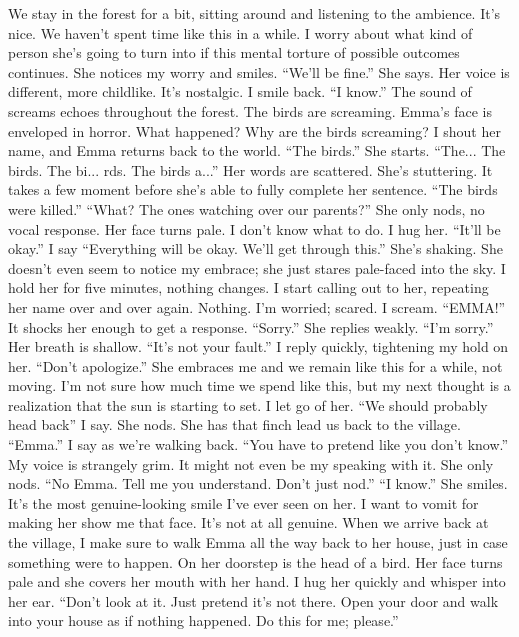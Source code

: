 \documentclass[openany, 12pt]{book}
\newcommand\tab[1][1cm]{\hspace*{#1}}
\begin{document}
\tab
We stay in the forest for a bit, sitting around and listening to the ambience. It’s nice. We haven’t spent time like this in a while. I worry about what kind of person she’s going to turn into if this mental torture of possible outcomes continues. She notices my worry and smiles. ``We’ll be fine.'' She says. Her voice is different, more childlike. It’s nostalgic.
\newline
\tab
I smile back. ``I know.''
\newline
\tab
The sound of screams echoes throughout the forest. The birds are screaming. Emma’s face is enveloped in horror. What happened? Why are the birds screaming? I shout her name, and Emma returns back to the world. ``The birds.'' She starts. ``The... The birds. The bi... rds. The birds a...'' Her words are scattered. She’s stuttering. It takes a few moment before she’s able to fully complete her sentence. ``The birds were killed.''
\newline
\tab
``What? The ones watching over our parents?'' She only nods, no vocal response. Her face turns pale. I don’t know what to do. I hug her. ``It’ll be okay.'' I say ``Everything will be okay. We’ll get through this.'' She’s shaking. She doesn’t even seem to notice my embrace; she just stares pale-faced into the sky. I hold her for five minutes, nothing changes. I start calling out to her, repeating her name over and over again. Nothing. I’m worried; scared. I scream. ``EMMA!''
\newline
\tab
It shocks her enough to get a response. ``Sorry.'' She replies weakly. ``I’m sorry.'' Her breath is shallow. 
\newline
\tab
``It’s not your fault.'' I reply quickly, tightening my hold on her. ``Don’t apologize.'' She embraces me and we remain like this for a while, not moving. I’m not sure how much time we spend like this, but my next thought is a realization that the sun is starting to set. I let go of her. ``We should probably head back'' I say. She nods.  She has that finch lead us back to the village. ``Emma.'' I say as we’re walking back. ``You have to pretend like you don’t know.'' My voice is strangely grim. It might not even be my speaking with it. She only nods. ``No Emma. Tell me you understand. Don’t just nod.''
\newline
\tab
``I know.'' She smiles. It’s the most genuine-looking smile I’ve ever seen on her. I want to vomit for making her show me that face. It’s not at all genuine. 
\newline
\tab
When we arrive back at the village, I make sure to walk Emma all the way back to her house, just in case something were to happen. On her doorstep is the head of a bird. Her face turns pale and she covers her mouth with her hand. I hug her quickly and whisper into her ear. ``Don’t look at it. Just pretend it’s not there. Open your door and walk into your house as if nothing happened. Do this for me; please.''
\end{document}
